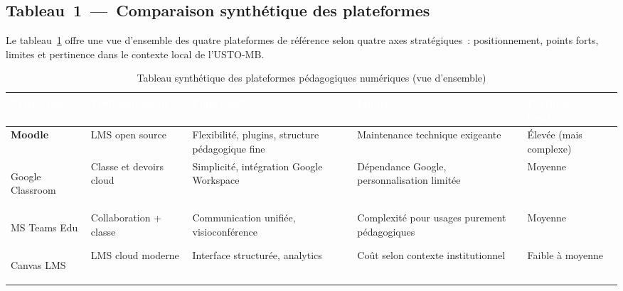 ﻿\documentclass[12pt,a4paper,oneside]{report}
\begin{document}
\subsection{Tableau~1~---~Comparaison synth\'etique des plateformes}

Le tableau~\ref{tab:compar_synth} offre une vue d'ensemble des quatre plateformes de r\'ef\'erence selon quatre axes strat\'egiques~: positionnement, points forts, limites et pertinence dans le contexte local de l'USTO-MB.

\renewcommand{\arraystretch}{1.8}
{\setlength{\tabcolsep}{7pt}
\begin{table}[H]
\centering
\caption{Tableau synth\'etique des plateformes p\'edagogiques num\'eriques (vue d'ensemble)}
\label{tab:compar_synth}
\begin{tabular}{|>{\bfseries}p{2.3cm}|p{2.5cm}|p{3.2cm}|p{3.0cm}|p{2.2cm}|}

\hline
\rowcolor{ustoblue}
\textcolor{white}{\textbf{Plateforme}} &
\textcolor{white}{\textbf{Positionnement}} &
\textcolor{white}{\textbf{Points forts}} &
\textcolor{white}{\textbf{Limites}} &
\textcolor{white}{\textbf{Pertinence locale}} \\
\hline

\rowcolor{ustolightblue!40}
Moodle &
LMS open source &
Flexibilit\'e, plugins, structure p\'edagogique fine &
Maintenance technique exigeante &
\'Elev\'ee (mais complexe) \\
\hline

\rowcolor{rowgray}
Google Classroom &
Classe et devoirs cloud &
Simplicit\'e, int\'egration Google Workspace &
D\'ependance Google, personnalisation limit\'ee &
Moyenne \\
\hline

\rowcolor{ustolightblue!40}
MS Teams Edu &
Collaboration + classe &
Communication unifi\'ee, visioconf\'erence &
Complexit\'e pour usages purement p\'edagogiques &
Moyenne \\
\hline

\rowcolor{rowgray}
Canvas LMS &
LMS cloud moderne &
Interface structur\'ee, analytics &
Co\^ut selon contexte institutionnel &
Faible \`a moyenne \\
\hline

\end{tabular}
\end{table}}
\end{document}

